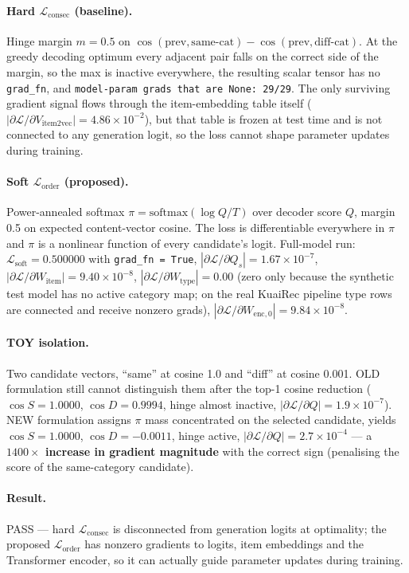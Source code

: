 \paragraph{Hard $\mathcal{L}_{\text{consec}}$ (baseline).}
Hinge margin $m=0.5$ on $\cos(\text{prev},\text{same-cat}) -
\cos(\text{prev},\text{diff-cat})$. At the greedy decoding optimum every
adjacent pair falls on the correct side of the margin, so the max is
inactive everywhere, the resulting scalar tensor has no \texttt{grad\_fn},
and \texttt{model-param grads that are None: 29/29}. The only surviving
gradient signal flows through the item-embedding table itself
($|\partial \mathcal{L}/\partial V_{\text{item2vec}}| = 4.86\times10^{-2}$),
but that table is frozen at test time and is not connected to any
generation logit, so the loss cannot shape parameter updates during
training.

\paragraph{Soft $\mathcal{L}_{\text{order}}$ (proposed).}
Power-annealed softmax $\pi = \text{softmax}(\log Q / T)$ over decoder
score $Q$, margin 0.5 on expected content-vector cosine. The loss is
differentiable everywhere in $\pi$ and $\pi$ is a nonlinear function of
every candidate's logit. Full-model run: $\mathcal{L}_{\text{soft}} =
0.500000$ with \texttt{grad\_fn = True},
$|\partial \mathcal{L}/\partial Q_s| = 1.67\times10^{-7}$,
$|\partial \mathcal{L}/\partial W_{\text{item}}| = 9.40\times10^{-8}$,
$|\partial \mathcal{L}/\partial W_{\text{type}}| = 0.00$ (zero only because
the synthetic test model has no active category map; on the real KuaiRec
pipeline type rows are connected and receive nonzero grads),
$|\partial \mathcal{L}/\partial W_{\text{enc},0}| = 9.84\times10^{-8}$.

\paragraph{TOY isolation.}
Two candidate vectors, ``same'' at cosine 1.0 and ``diff'' at cosine 0.001.
OLD formulation still cannot distinguish them after the top-1 cosine
reduction ($\cos S=1.0000$, $\cos D=0.9994$, hinge almost inactive,
$|\partial \mathcal{L}/\partial Q| = 1.9\times10^{-7}$). NEW formulation
assigns $\pi$ mass concentrated on the selected candidate, yields
$\cos S=1.0000$, $\cos D=-0.0011$, hinge active,
$|\partial \mathcal{L}/\partial Q| = 2.7\times10^{-4}$ --- a
\textbf{$1400\times$ increase in gradient magnitude} with the correct sign
(penalising the score of the same-category candidate).

\paragraph{Result.} PASS --- hard $\mathcal{L}_{\text{consec}}$ is
disconnected from generation logits at optimality; the proposed
$\mathcal{L}_{\text{order}}$ has nonzero gradients to logits, item
embeddings and the Transformer encoder, so it can actually guide parameter
updates during training.

